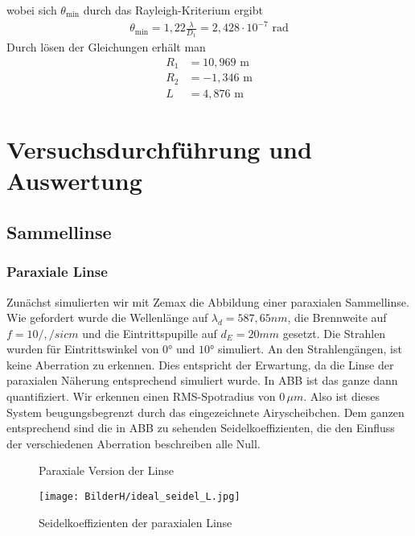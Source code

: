 \documentclass[twoside,colorback,accentcolor=tud4c,11pt]{tudreport}
\begin{document}
wobei sich $ \theta_{\text{min}} $ durch das Rayleigh-Kriterium ergibt
\begin{align}
\theta_{\text{min}}=1,22\frac{\lambda}{D_1}=2,428\cdot 10^{-7}\text{ rad}
\end{align}
Durch lösen der Gleichungen erhält man
\begin{align}
R_1&=10,969\text{ m}\\
R_2&=-1,346\text{ m}\\
L&=4,876\text{ m}
\end{align}
\chapter{Versuchsdurchführung und Auswertung}
	\section{Sammellinse}
		\subsection{Paraxiale Linse}
		
		Zunächst simulierten wir mit Zemax die Abbildung einer paraxialen Sammellinse. Wie gefordert wurde die Wellenlänge auf $\lambda_d = 587,65 nm$, die Brennweite auf $f = 10 /, /si{cm}$ und die Eintrittspupille auf $d_E = 20 mm$ gesetzt. Die Strahlen wurden für Eintrittswinkel von $0°$ und $10°$ simuliert. An den Strahlengängen, ist keine Aberration zu erkennen. Dies entspricht der Erwartung, da die Linse der paraxialen Näherung entsprechend simuliert wurde. In ABB ist das ganze dann quantifiziert. Wir erkennen einen RMS-Spotradius von $0 \, \mu m$. Also ist dieses System beugungsbegrenzt durch das eingezeichnete Airyscheibchen. Dem ganzen entsprechend sind die in ABB zu sehenden Seidelkoeffizienten, die den Einfluss der verschiedenen Aberration beschreiben alle Null. 
		
	\begin{figure}[H]
\centering
  \quad
  \quad   
  \caption{Paraxiale Version der Linse}
\end{figure}		
		
\begin{figure}[H]
\centering
   	\begin{minipage}[b]{\textwidth}
 \centering  	\texttt{[image: BilderH/ideal\_seidel\_L.jpg]}
   	\caption{Seidelkoeffizienten der paraxialen Linse}
  	\end{minipage}
\end{figure}		
		
\end{document}
